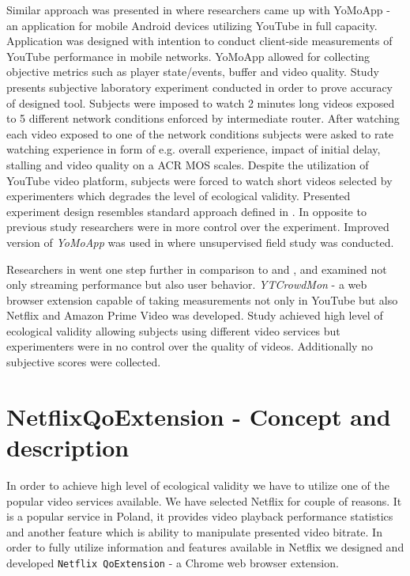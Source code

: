 \documentclass[conference]{IEEEtran}
\begin{document}
    Similar approach was presented in \cite{yo_mo_app_technical} where researchers came up with YoMoApp - an application for mobile Android devices utilizing YouTube in full capacity. 
    Application was designed with intention to conduct client-side measurements of YouTube performance in mobile networks. YoMoApp allowed for collecting objective metrics such as player state/events, buffer and video quality.
    Study presents subjective laboratory experiment conducted in order to prove accuracy of designed tool.
    Subjects were imposed to watch 2 minutes long videos exposed to 5 different network conditions enforced by intermediate router. After watching each video exposed to one of the network conditions subjects were asked to rate watching experience in form of e.g. overall experience, impact of initial delay, stalling and video quality on a ACR \cite{ITU-T-P.913} MOS \cite{P.800} scales.
    Despite the utilization of YouTube video platform, subjects were forced to watch short videos selected by experimenters which degrades the level of ecological validity. 
    Presented experiment design resembles standard approach defined in \cite{BT.500-14}. 
    In opposite to previous study researchers were in more control over the experiment.
    Improved version of \textit{YoMoApp} was used in \cite{yo_mo_app_unsupervised_qoe_field_study} where unsupervised field study was conducted.
    
    Researchers in \cite{are_you_still_watching_YT_CrowdMon} went one step further in comparison to \cite{you_slow} and \cite{yo_mo_app_technical}, \cite{yo_mo_app_unsupervised_qoe_field_study} and examined not only streaming performance but also user behavior. \textit{YTCrowdMon} - a web browser extension capable of taking measurements not only in YouTube but also Netflix and Amazon Prime Video was developed.
    Study achieved high level of ecological validity allowing subjects using different video services but experimenters were in no control over the quality of videos. Additionally no subjective scores were collected.

\section{NetflixQoExtension - Concept and description}
In order to achieve high level of ecological validity we have to utilize one of the popular video services available. We have selected Netflix for couple of reasons. It is a popular service in Poland, it provides video playback performance statistics and another feature which is ability to manipulate presented video bitrate.
In order to fully utilize information and features available in Netflix we designed and developed \verb|Netflix QoExtension| - a Chrome web browser extension.
\end{document}
